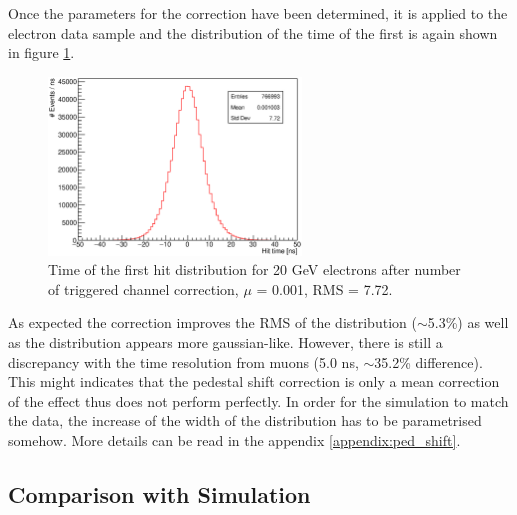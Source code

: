 \documentclass[twoside,a4paper,11pt]{article}
\begin{document}
Once the parameters for the correction have been determined, it is applied to the electron data sample and the distribution of the time of the first is again shown in figure \ref{fig:timing_electrons_corr}.
\begin{figure}[htbp]
\begin{center}
\includegraphics[width=0.6\textwidth]{fig/timing_electrons_corr.eps}
\caption{Time of the first hit distribution for 20 GeV electrons after number of triggered channel correction, $\mu$ = 0.001, RMS = 7.72.}
\label{fig:timing_electrons_corr}
\end{center}
\end{figure}
As expected the correction improves the RMS of the distribution ($\sim$5.3\%) as well as the distribution appears more gaussian-like. However, there is still a discrepancy with the time resolution from muons (5.0 ns, $\sim$35.2\% difference). This might indicates that the pedestal shift correction is only a mean correction of the effect thus does not perform perfectly. In order for the simulation to match the data, the increase of the width of the distribution has to be parametrised somehow. More details can be read in the appendix \ref{appendix:ped_shift}.

\subsection{Comparison with Simulation}
\end{document}
